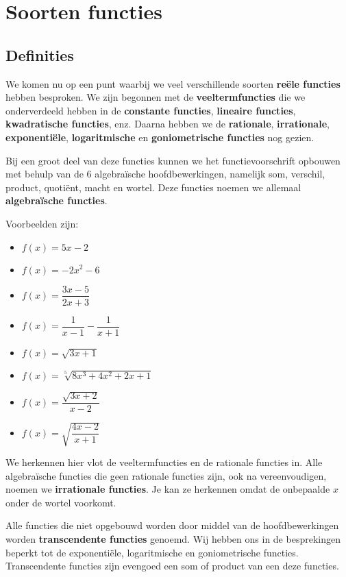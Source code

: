 \documentclass[12pt]{article}
\begin{document}
\section{Soorten functies}

\subsection{Definities}
We komen nu op een punt waarbij we veel verschillende soorten {\bf reële functies} hebben besproken. We zijn begonnen met de {\bf veeltermfuncties} die we onderverdeeld hebben in de {\bf constante functies}, {\bf lineaire functies}, {\bf kwadratische functies}, enz. Daarna hebben we de {\bf rationale}, {\bf irrationale}, {\bf exponentiële}, {\bf logaritmische} en {\bf goniometrische functies} nog gezien.

Bij een groot deel van deze functies kunnen we het functievoorschrift opbouwen met behulp van de 6 algebraïsche hoofdbewerkingen, namelijk som, verschil, product, quotiënt, macht en wortel. Deze functies noemen we allemaal {\bf algebraïsche functies}.

Voorbeelden zijn:
\begin{multicols}{2}
  \begin{itemize}
    \item $\displaystyle f(x)=5x-2$
    \item $\displaystyle f(x)=-2x^2-6$
    \item $\displaystyle f(x)=\dfrac{3x-5}{2x+3}$
    \item $\displaystyle f(x)=\dfrac{1}{x-1}-\dfrac{1}{x+1}$
    \item $\displaystyle f(x)=\sqrt{3x+1}$
    \item $\displaystyle f(x)=\sqrt[5]{8x^3+4x^2+2x+1}$
    \item $\displaystyle f(x)=\dfrac{\sqrt{3x+2}}{x-2}$
    \item $\displaystyle f(x)=\sqrt{\dfrac{4x-2}{x+1}}$
  \end{itemize}
\end{multicols}

We herkennen hier vlot de veeltermfuncties en de rationale functies in. Alle algebraïsche functies die geen rationale functies zijn, ook na vereenvoudigen, noemen we {\bf irrationale functies}. Je kan ze herkennen omdat de onbepaalde $x$ onder de wortel voorkomt.

Alle functies die niet opgebouwd worden door middel van de hoofdbewerkingen worden {\bf transcendente functies} genoemd. Wij hebben ons in de besprekingen beperkt tot de exponentiële, logaritmische en goniometrische functies. Transcendente functies zijn evengoed een som of product van een deze functies.
\end{document}
